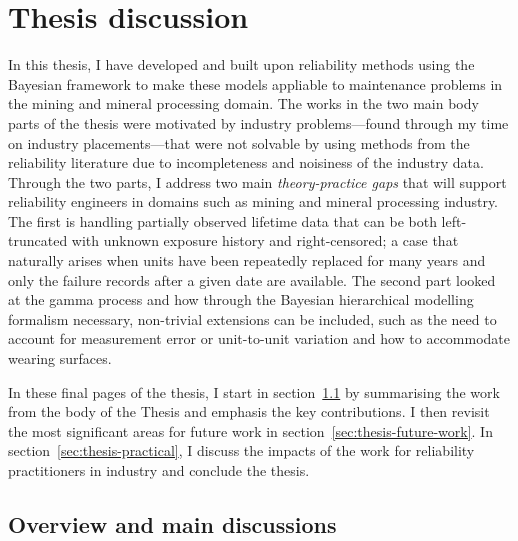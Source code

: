 \chapter{Thesis discussion}\label{chap:chapter7}

In this thesis, I have developed and built upon reliability methods using the Bayesian framework to make these models appliable to maintenance problems in the mining and mineral processing domain. The works in the two main body parts of the thesis were motivated by industry problems---found through my time on industry placements---that were not solvable by using methods from the reliability literature due to incompleteness and noisiness of the industry data. Through the two parts, I address two main \textit{theory-practice gaps} that will support reliability engineers in domains such as mining and mineral processing industry. The first is handling partially observed lifetime data that can be both left-truncated with unknown exposure history and right-censored; a case that naturally arises when units have been repeatedly replaced for many years and only the failure records after a given date are available. The second part looked at the gamma process and how through the Bayesian hierarchical modelling formalism necessary, non-trivial extensions can be included, such as the need to account for measurement error or unit-to-unit variation and how to accommodate wearing surfaces.

In these final pages of the thesis, I start in section~\ref{sec:thesis-summary} by summarising the work from the body of the Thesis and emphasis the key contributions. I then revisit the most significant areas for future work in section~\ref{sec:thesis-future-work}. In section~\ref{sec:thesis-practical}, I discuss the impacts of the work for reliability practitioners in industry and conclude the thesis.

\section{Overview and main discussions} \label{sec:thesis-summary}

